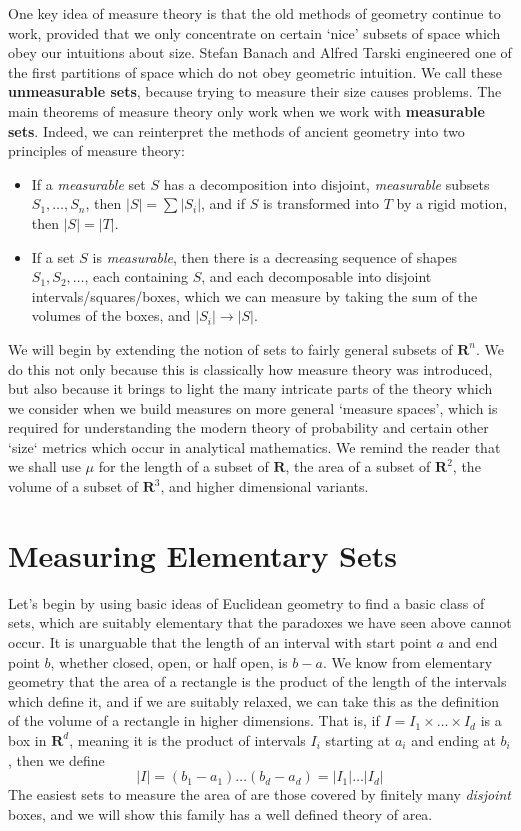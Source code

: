 %
One key idea of measure theory is that the old methods of geometry continue to work, provided that we only concentrate on certain `nice' subsets of space which obey our intuitions about size. Stefan Banach and Alfred Tarski engineered one of the first partitions of space which do not obey geometric intuition. We call these {\bf unmeasurable sets}, because trying to measure their size causes problems. The main theorems of measure theory only work when we work with {\bf measurable sets}. Indeed, we can reinterpret the methods of ancient geometry into two principles of measure theory:
%
\begin{itemize}
    \item If a {\it measurable} set $S$ has a decomposition into disjoint, {\it measurable} subsets $S_1, \dots, S_n$, then $|S| = \sum |S_i|$, and if $S$ is transformed into $T$ by a rigid motion, then $|S| = |T|$.

    \item If a set $S$ is {\it measurable}, then there is a decreasing sequence of shapes $S_1, S_2, \dots$, each containing $S$, and each decomposable into disjoint intervals/squares/boxes, which we can measure by taking the sum of the volumes of the boxes, and $|S_i| \to |S|$.
\end{itemize}
%
We will begin by extending the notion of sets to fairly general subsets of $\mathbf{R}^n$. We do this not only because this is classically how measure theory was introduced, but also because it brings to light the many intricate parts of the theory which we consider when we build measures on more general `measure spaces', which is required for understanding the modern theory of probability and certain other `size` metrics which occur in analytical mathematics. We remind the reader that we shall use $\mu$ for the length of a subset of $\mathbf{R}$, the area of a subset of $\mathbf{R}^2$, the volume of a subset of $\mathbf{R}^3$, and higher dimensional variants.

\section{Measuring Elementary Sets}

Let's begin by using basic ideas of Euclidean geometry to find a basic class of sets, which are suitably elementary that the paradoxes we have seen above cannot occur. It is unarguable that the length of an interval with start point $a$ and end point $b$, whether closed, open, or half open, is $b - a$. We know from elementary geometry that the area of a rectangle is the product of the length of the intervals which define it, and if we are suitably relaxed, we can take this as the definition of the volume of a rectangle in higher dimensions. That is, if $I = I_1 \times \dots \times I_d$ is a box in $\mathbf{R}^d$, meaning it is the product of intervals $I_i$ starting at $a_i$ and ending at $b_i$, then we define
%
\[ |I| = (b_1 - a_1) \dots (b_d - a_d) = |I_1| \dots |I_d| \]
%
The easiest sets to measure the area of are those covered by finitely many {\it disjoint} boxes, and we will show this family has a well defined theory of area.

